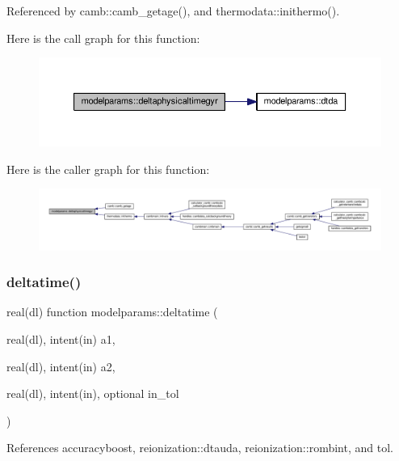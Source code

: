 Referenced by camb\+::camb\+\_\+getage(), and thermodata\+::inithermo().

Here is the call graph for this function\+:
\nopagebreak
\begin{figure}[H]
\begin{center}
\leavevmode
\includegraphics[width=350pt]{namespacemodelparams_ac094d31babe3489387c12a3c2ab05549_cgraph}
\end{center}
\end{figure}
Here is the caller graph for this function\+:
\nopagebreak
\begin{figure}[H]
\begin{center}
\leavevmode
\includegraphics[width=350pt]{namespacemodelparams_ac094d31babe3489387c12a3c2ab05549_icgraph}
\end{center}
\end{figure}
\mbox{\label{namespacemodelparams_ae583f09e6523f430605f421d2db537ae}} 
\subsubsection{\texorpdfstring{deltatime()}{deltatime()}}
{\footnotesize\ttfamily real(dl) function modelparams\+::deltatime (\begin{DoxyParamCaption}\item[{real(dl), intent(in)}]{a1,  }\item[{real(dl), intent(in)}]{a2,  }\item[{real(dl), intent(in), optional}]{in\+\_\+tol }\end{DoxyParamCaption})}



References accuracyboost, reionization\+::dtauda, reionization\+::rombint, and tol.



